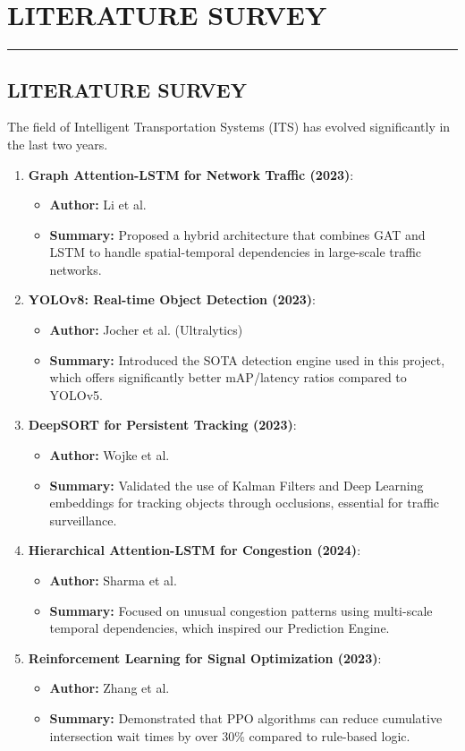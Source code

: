 \documentclass[12pt,times,a4paper]{report}
\newcommand\HRule{\rule{\textwidth}{1pt}}
\begin{document}
\chapter{LITERATURE SURVEY}
\HRule
\section{LITERATURE SURVEY}
The field of Intelligent Transportation Systems (ITS) has evolved significantly in the last two years.
\begin{enumerate}
    \item \textbf{Graph Attention-LSTM for Network Traffic (2023)}:
    \begin{itemize}
        \item \textbf{Author:} Li et al.
        \item \textbf{Summary:} Proposed a hybrid architecture that combines GAT and LSTM to handle spatial-temporal dependencies in large-scale traffic networks.
    \end{itemize}
    \item \textbf{YOLOv8: Real-time Object Detection (2023)}:
    \begin{itemize}
        \item \textbf{Author:} Jocher et al. (Ultralytics)
        \item \textbf{Summary:} Introduced the SOTA detection engine used in this project, which offers significantly better mAP/latency ratios compared to YOLOv5.
    \end{itemize}
    \item \textbf{DeepSORT for Persistent Tracking (2023)}:
    \begin{itemize}
        \item \textbf{Author:} Wojke et al.
        \item \textbf{Summary:} Validated the use of Kalman Filters and Deep Learning embeddings for tracking objects through occlusions, essential for traffic surveillance.
    \end{itemize}
    \item \textbf{Hierarchical Attention-LSTM for Congestion (2024)}:
    \begin{itemize}
        \item \textbf{Author:} Sharma et al.
        \item \textbf{Summary:} Focused on unusual congestion patterns using multi-scale temporal dependencies, which inspired our Prediction Engine.
    \end{itemize}
    \item \textbf{Reinforcement Learning for Signal Optimization (2023)}:
    \begin{itemize}
        \item \textbf{Author:} Zhang et al.
        \item \textbf{Summary:} Demonstrated that PPO algorithms can reduce cumulative intersection wait times by over 30\% compared to rule-based logic.
    \end{itemize}
\end{enumerate}
\end{document}
